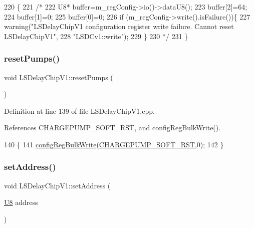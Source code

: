 \begin{DoxyCode}
220                          \{
221 \textcolor{comment}{/*}
222 \textcolor{comment}{  U8* buffer=m\_regConfig->io()->dataU8();
}
223 \textcolor{comment}{  buffer[2]=64;
}
224 \textcolor{comment}{  buffer[1]=0;
}
225 \textcolor{comment}{  buffer[0]=0;
}
226 \textcolor{comment}{  if (m\_regConfig->write().isFailure())\{
}
227 \textcolor{comment}{    warning("LSDelayChipV1 configuration register write failure. Cannot reset LSDelayChipV1",
}
228 \textcolor{comment}{        "LSDCv1::write");
}
229 \textcolor{comment}{  \}
}
230 \textcolor{comment}{  */}
231 \}
\end{DoxyCode}
\mbox{\label{classLSDelayChipV1_a5b2c2e527b044b128306695828e9fd19}} 
\subsubsection{\texorpdfstring{reset\+Pumps()}{resetPumps()}}
{\footnotesize\ttfamily void L\+S\+Delay\+Chip\+V1\+::reset\+Pumps (\begin{DoxyParamCaption}{ }\end{DoxyParamCaption})}



Definition at line 139 of file L\+S\+Delay\+Chip\+V1.\+cpp.



References C\+H\+A\+R\+G\+E\+P\+U\+M\+P\+\_\+\+S\+O\+F\+T\+\_\+\+R\+ST, and config\+Reg\+Bulk\+Write().


\begin{DoxyCode}
140 \{
141     \hyperlink{classLSDelayChipV1_afa626b5d52f8723bcaa3205d1cc7a0f8}{configRegBulkWrite}(\hyperlink{LSDelayChipV1_8h_a08aff1d45994f410f4f4a6e7e9a13db9}{CHARGEPUMP\_SOFT\_RST},0);
142 \}
\end{DoxyCode}
\mbox{\label{classLSDelayChipV1_a04ec44c79258fd22f7d2d5ea27a67648}} 
\subsubsection{\texorpdfstring{set\+Address()}{setAddress()}}
{\footnotesize\ttfamily void L\+S\+Delay\+Chip\+V1\+::set\+Address (\begin{DoxyParamCaption}\item[{\hyperlink{ICECALv3_8h_a3cb25ca6f51f003950f9625ff05536fc}{U8}}]{address }\end{DoxyParamCaption})\hspace{0.3cm}{\ttfamily [inline]}}



